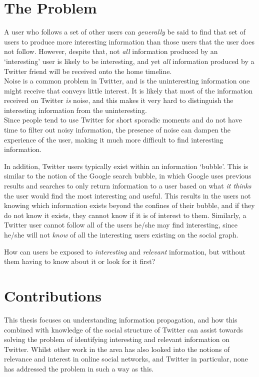 \section{The Problem}
A user who follows a set of other users can \textit{generally} be said to find that set of users to produce more interesting information than those users that the user does not follow. However, despite that, not \textit{all} information produced by an `interesting' user is likely to be interesting, and yet \textit{all} information produced by a Twitter friend will be received onto the home timeline.\\
Noise is a common problem in Twitter, and is the uninteresting information one might receive that conveys little interest. It is likely that most of the information received on Twitter \textit{is} noise, and this makes it very hard to distinguish the interesting information from the uninteresting.\\
Since people tend to use Twitter for short sporadic moments and do not have time to filter out noisy information, the presence of noise can dampen the experience of the user, making it much more difficult to find interesting information.

In addition, Twitter users typically exist within an information `bubble'. This is similar to the notion of the Google search bubble, in which Google uses previous results and searches to only return information to a user based on what \textit{it thinks} the user would find the most interesting and useful. This results in the users not knowing which information exists beyond the confines of their bubble, and if they do not know it exists, they cannot know if it is of interest to them. Similarly, a Twitter user cannot follow all of the users he/she may find interesting, since he/she will not \textit{know} of all the interesting users existing on the social graph.

How can users be exposed to \textit{interesting} and \textit{relevant} information, but without them having to know about it or look for it first?


\section{Contributions}
This thesis focuses on understanding information propagation, and how this combined with knowledge of the social structure of Twitter can assist towards solving the problem of identifying interesting and relevant information on Twitter. 
Whilst other work in the area has also looked into the notions of relevance and interest in online social networks, and Twitter in particular, none has addressed the problem in such a way as this.

